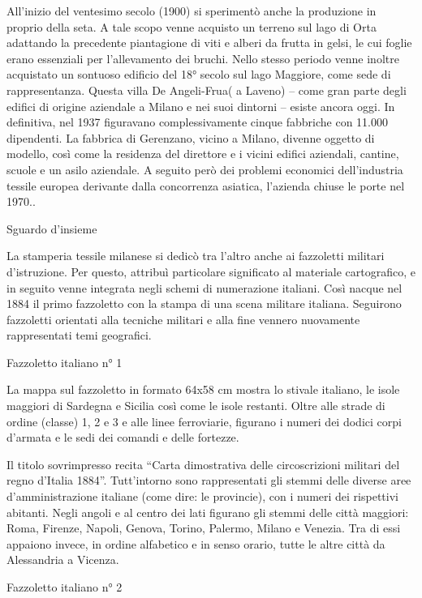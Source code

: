 All'inizio del ventesimo secolo (1900) si sperimentò anche la produzione
in proprio della seta. A tale scopo venne acquisto un terreno sul lago
di Orta adattando la precedente piantagione di viti e alberi da frutta
in gelsi, le cui foglie erano essenziali per l'allevamento dei bruchi.
Nello stesso periodo venne inoltre acquistato un sontuoso edificio del
18° secolo sul lago Maggiore, come sede di rappresentanza. Questa villa
De Angeli-Frua( a Laveno) -- come gran parte degli edifici di origine
aziendale a Milano e nei suoi dintorni -- esiste ancora oggi. In
definitiva, nel 1937 figuravano complessivamente cinque fabbriche con
11.000 dipendenti. La fabbrica di Gerenzano, vicino a Milano, divenne
oggetto di modello, così come la residenza del direttore e i vicini
edifici aziendali, cantine, scuole e un asilo aziendale. A seguito però
dei problemi economici dell'industria tessile europea derivante dalla
concorrenza asiatica, l'azienda chiuse le porte nel 1970..

Sguardo d'insieme

La stamperia tessile milanese si dedicò tra l'altro anche ai fazzoletti
militari d'istruzione. Per questo, attribuì particolare significato al
materiale cartografico, e in seguito venne integrata negli schemi di
numerazione italiani. Così nacque nel 1884 il primo fazzoletto con la
stampa di una scena militare italiana. Seguirono fazzoletti orientati
alla tecniche militari e alla fine vennero nuovamente rappresentati temi
geografici.

Fazzoletto italiano n° 1

La mappa sul fazzoletto in formato 64x58 cm mostra lo stivale italiano,
le isole maggiori di Sardegna e Sicilia così come le isole restanti.
Oltre alle strade di ordine (classe) 1, 2 e 3 e alle linee ferroviarie,
figurano i numeri dei dodici corpi d'armata e le sedi dei comandi e
delle fortezze.

Il titolo sovrimpresso recita ``Carta dimostrativa delle circoscrizioni
militari del regno d'Italia 1884''. Tutt'intorno sono rappresentati gli
stemmi delle diverse aree d'amministrazione italiane (come dire: le
provincie), con i numeri dei rispettivi abitanti. Negli angoli e al
centro dei lati figurano gli stemmi delle città maggiori: Roma, Firenze,
Napoli, Genova, Torino, Palermo, Milano e Venezia. Tra di essi appaiono
invece, in ordine alfabetico e in senso orario, tutte le altre città da
Alessandria a Vicenza.

Fazzoletto italiano n° 2

